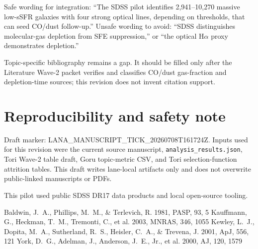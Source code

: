 \documentclass[twocolumn]{aastex631}
\begin{document}
Safe wording for integration: ``The SDSS pilot identifies 2,941--10,270 massive low-sSFR galaxies with four strong optical lines, depending on thresholds, that can seed CO/dust follow-up.''  Unsafe wording to avoid: ``SDSS distinguishes molecular-gas depletion from SFE suppression,'' or ``the optical H$\alpha$ proxy demonstrates depletion.''

Topic-specific bibliography remains a gap.  It should be filled only after the Literature Wave-2 packet verifies and classifies CO/dust gas-fraction and depletion-time sources; this revision does not invent citation support.

\section*{Reproducibility and safety note}
Draft marker: LANA\_MANUSCRIPT\_TICK\_20260708T161724Z.  Inputs used for this revision were the current source manuscript, \texttt{analysis\_results.json}, Tori Wave-2 table draft, Goru topic-metric CSV, and Tori selection-function attrition tables.  This draft writes lane-local artifacts only and does not overwrite public-linked manuscripts or PDFs.

\acknowledgments
This pilot used public SDSS DR17 data products and local open-source tooling.

\begin{thebibliography}{}
 Baldwin, J.~A., Phillips, M.~M., \& Terlevich, R. 1981, PASP, 93, 5
 Kauffmann, G., Heckman, T.~M., Tremonti, C., et al. 2003, MNRAS, 346, 1055
 Kewley, L.~J., Dopita, M.~A., Sutherland, R.~S., Heisler, C.~A., \& Trevena, J. 2001, ApJ, 556, 121
 York, D.~G., Adelman, J., Anderson, J.~E., Jr., et al. 2000, AJ, 120, 1579
\end{thebibliography}
\end{document}
